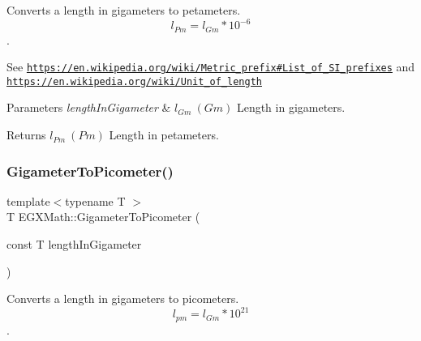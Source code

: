 Converts a length in gigameters to petameters. \[ l_{Pm}=l_{Gm} * 10^{-6} \]. 

See \href{https://en.wikipedia.org/wiki/Metric_prefix#List_of_SI_prefixes}{\tt https\+://en.\+wikipedia.\+org/wiki/\+Metric\+\_\+prefix\#\+List\+\_\+of\+\_\+\+S\+I\+\_\+prefixes} and \href{https://en.wikipedia.org/wiki/Unit_of_length}{\tt https\+://en.\+wikipedia.\+org/wiki/\+Unit\+\_\+of\+\_\+length} 
\begin{DoxyParams}{Parameters}
{\em length\+In\+Gigameter} & $ l_{Gm}\ (Gm)$ Length in gigameters. \\
\hline
\end{DoxyParams}
\begin{DoxyReturn}{Returns}
$ l_{Pm}\ (Pm)$ Length in petameters. 
\end{DoxyReturn}
\mbox{\label{group___e_g_x_math-_conversions-_length_conversions-_gigameter-_s_i_gae9cea35a0ce747d02ec8b6cf7bfeaa7e}} 
\subsubsection{\texorpdfstring{Gigameter\+To\+Picometer()}{GigameterToPicometer()}}
{\footnotesize\ttfamily template$<$typename T $>$ \\
T E\+G\+X\+Math\+::\+Gigameter\+To\+Picometer (\begin{DoxyParamCaption}\item[{const T}]{length\+In\+Gigameter }\end{DoxyParamCaption})}



Converts a length in gigameters to picometers. \[ l_{pm}=l_{Gm} * 10^{21} \]. 

